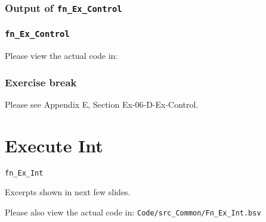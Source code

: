 
\begin{frame}[fragile]
\frametitle{Output of {\tt fn\_Ex\_Control}}

\footnotesize


\end{frame}


\begin{frame}
\frametitle{{\tt fn\_Ex\_Control}}

\footnotesize

\begin{center}\large
 Please view the actual code in: 
\end{center}

\end{frame}


\begin{frame}
\frametitle{\EmojiExercise \hmm Exercise break}

Please see Appendix E, Section Ex-06-D-Ex-Control.

\end{frame}


\section{Execute Int}

\begin{frame}[fragile]

\begin{center}
  {\LARGE\tt fn\_Ex\_Int}

  \vspace{5ex}

  Excerpts shown in next few slides.

  Please also view the actual code in:
  {\tt Code/src\_Common/Fn\_Ex\_Int.bsv}

\end{center}

\end{frame}


